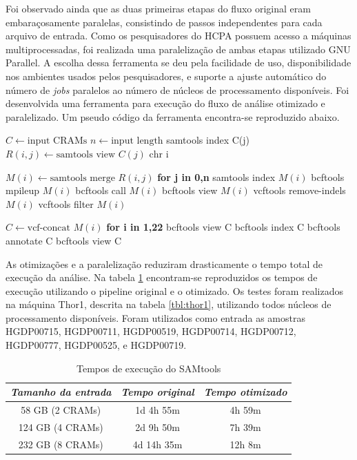 \documentclass[cic,tc]{iiufrgs}
\begin{document}
Foi observado ainda que as duas primeiras etapas do fluxo original eram
embaraçosamente paralelas, consistindo de passos independentes para cada
arquivo de entrada.  Como os pesquisadores do HCPA possuem acesso a máquinas
multiprocessadas, foi realizada uma paralelização de ambas etapas utilizado GNU
Parallel\cite{tange_ole_2021_5233953}. A escolha dessa ferramenta se deu pela
facilidade de uso, disponibilidade nos ambientes usados pelos pesquisadores, e
suporte a ajuste automático do número de \textit{jobs} paralelos ao número de
núcleos de processamento disponíveis. Foi desenvolvida uma ferramenta para
execução do fluxo de análise otimizado e paralelizado. Um pseudo código da
ferramenta encontra-se reproduzido abaixo.

\begin{algorithmic}
  \State $C \gets \text{input CRAMs}$
  \State $n \gets \text{input length}$
  \State samtools index C(j)
    \State $R(i,j) \gets \text{samtools view } C(j) \text{ chr i}$
  \EndFor
\EndFor

  \State $M(i) \gets \text{samtools merge } R(i,j)$ \textbf{for j in 0,n}
  \State samtools index $M(i)$
  \State bcftools mpileup $M(i)$
  \State bcftools call $M(i)$
  \State bcftools view $M(i)$
  \State vcftools remove-indels $M(i)$
  \State vcftools filter $M(i)$
\EndFor

\State $C \gets \text{vcf-concat } M(i)$ \textbf{for i in 1,22}
\State bcftools view C
\State bcftools index C
\State bcftools annotate C
\State bcftools view C
\end{algorithmic}

As otimizações e a paralelização reduziram drasticamente o tempo total de
execução da análise. Na tabela \ref{tbl:SAMtools} encontram-se reproduzidos os
tempos de execução utilizando o pipeline original e o otimizado. Os testes
foram realizados na máquina Thor1, descrita na tabela \ref{tbl:thor1},
utilizando todos núcleos de processamento disponíveis. Foram utilizados como
entrada as amostras HGDP00715, HGDP00711, HGDP00519, HGDP00714, HGDP00712,
HGDP00777, HGDP00525, e HGDP00719.

\begin{table}[h]
    \caption{Tempos de execução do SAMtools}
    \centering
        \begin{tabular}{c|c|c}
          \hline
          \textit{Tamanho da entrada}  &   \textit{Tempo original}  & \textit{Tempo otimizado} \\
          \hline
          \hline
          58 GB (2 CRAMs) & 1d 4h 55m & 4h 59m \\
          124 GB (4 CRAMs) & 2d 9h 50m & 7h 39m \\
          232 GB (8 CRAMs) & 4d 14h 35m & 12h 8m \\
          \hline
        \end{tabular}
    \label{tbl:SAMtools}
\end{table}
\end{document}

